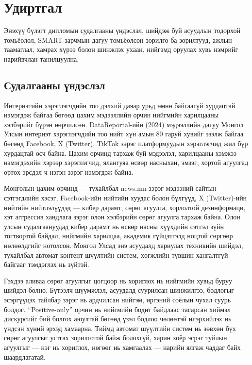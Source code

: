 ﻿%

\chapter{Удиртгал}
\label{Chapter1}

Энэхүү бүлэгт дипломын судалгааны үндэслэл, шийдэж буй асуудлын тодорхой
томьёолол, SMART зарчмын дагуу томьёолсон зорилго ба зорилтууд, ажлын
таамаглал, хамрах хүрээ болон шинжлэх ухаан, нийгэмд оруулах хувь нэмрийг
нарийвчлан танилцуулна.

\section{Судалгааны үндэслэл}

Интернэтийн хэрэглэгчдийн тоо дэлхий даяар урьд өмнө байгаагүй хурдацтай
нэмэгдэж байгаа бөгөөд цахим мэдээллийн орчин нийгмийн харилцааны хэлбэрийг
бүрэн өөрчилсөн. DataReportal-ийн (2024) мэдээллийн дагуу \cite{datareportal2024}
Монгол Улсын интернэт хэрэглэгчдийн тоо нийт хүн амын 80 гаруй хувийг эзэлж байгаа бөгөөд
Facebook, X (Twitter), TikTok зэрэг платформуудын хэрэглэгчид жил бүр хурдацтай
өсч байна. Цахим орчинд тархаж буй мэдээлэл, харилцааны хэмжээ нэмэгдэхийн
хэрээр хэрэглэгчид, ялангуяа өсвөр насныхан, эмзэг, хортой агуулгад
өртөх эрсдэл ч нэгэн зэрэг нэмэгдэж байна.

Монголын цахим орчинд --- тухайлбал news.mn зэрэг мэдээний сайтын сэтгэгдлийн
хэсэг, Facebook-ийн нийтийн хуудас болон бүлгүүд, X (Twitter)-ийн нийтийн
нийтлэлүүдэд --- кибер дарамт, сөрөг агуулга, хорлолтой дезинформаци, хэт
аггрессив хандлага зэрэг олон хэлбэрийн сөрөг агуулга тархаж байна. Олон
улсын судалгаануудад \cite{kowalski2014,vogels2022} кибер дарамт нь өсвөр насны
хүүхдийн сэтгэл зүйн тогтвортой байдал, нийгмийн харилцаа, академик
гүйцэтгэлд ноцтой сөргөөр нөлөөлдгийг нотолсон. Монгол Улсад энэ асуудалд
хариулах техникийн шийдэл, тухайлбал автомат контент шүүлтийн систем,
хөгжлийн түвшин хангалтгүй байгааг тэмдэглэх нь зүйтэй.

Гэхдээ аливаа сөрөг агуулгыг цогцоор нь хориглох нь нийгмийн хувьд буруу
шийдэл болно. Бүтээлч шүүмжлэл, асуудалд суурилсан шинжилгээ, бодлогыг
эсэргүүцэх тайлбар зэрэг нь ардчилсан нийгэм, иргэний соёлын чухал суурь
болдог. ``Positive-only'' орчин нь нийгмийн бодит байдлаас тасарсан хиймэл
дискурсийг бий болгох аюултай бөгөөд үзэл бодлоо чөлөөтэй илэрхийлэх нь
үндсэн хүний эрхэд хамаарна. Тиймд автомат шүүлтийн систем нь зөвхөн бүх
сөрөг агуулгыг устгах зорилготой байж болохгүй, харин хоёр эсрэг туйлын
агуулгыг --- нэг нь хориглох, нөгөөг нь хамгаалах --- нарийн ялгаж чаддаг
байх шаардлагатай.

